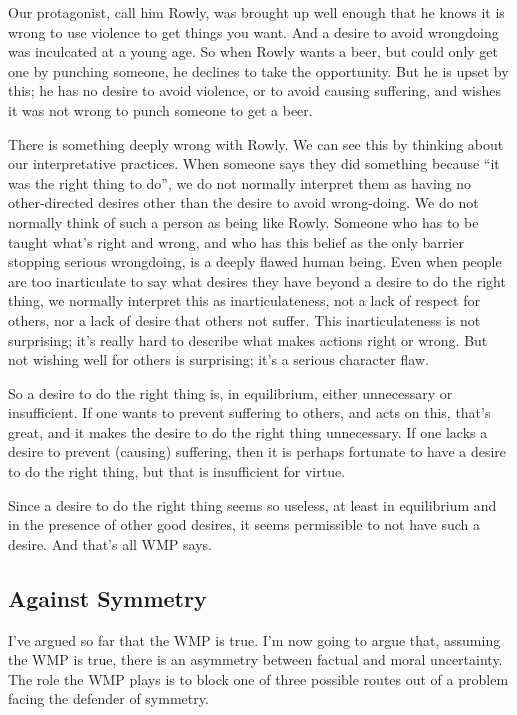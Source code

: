 Our protagonist, call him \gls{Rowly}, was brought up well enough that he knows it is wrong to use violence to get things you want. And a desire to avoid wrongdoing was inculcated at a young age. So when \gls{Rowly} wants a beer, but could only get one by punching someone, he declines to take the opportunity. But he is upset by this; he has no desire to avoid violence, or to avoid causing suffering, and wishes it was not wrong to punch someone to get a beer.

There is something deeply wrong with \gls{Rowly}. We can see this by thinking about our interpretative practices. When someone says they did something because ``it was the right thing to do'', we do not normally interpret them as having no other-directed desires other than the desire to avoid wrong-doing. We do not normally think of such a person as being like \gls{Rowly}. Someone who has to be taught what's right and wrong, and who has this belief as the only barrier stopping serious wrongdoing, is a deeply flawed human being. Even when people are too inarticulate to say what desires they have beyond a desire to do the right thing, we normally interpret this as inarticulateness, not a lack of respect for others, nor a lack of desire that others not suffer. This inarticulateness is not surprising; it's really hard to describe what makes actions right or wrong. But not wishing well for others is surprising; it's a serious character flaw.

So a desire to do the right thing is, in equilibrium, either unnecessary or insufficient. If one wants to prevent suffering to others, and acts on this, that's great, and it makes the desire to do the right thing unnecessary. If one lacks a desire to prevent (causing) suffering, then it is perhaps fortunate to have a desire to do the right thing, but that is insufficient for virtue.

Since a desire to do the right thing seems so useless, at least in equilibrium and in the presence of other good desires, it seems permissible to not have such a desire. And that's all WMP says.

\subsection{Against Symmetry}
\label{againstsymmetry}

I've argued so far that the WMP is true. I'm now going to argue that, assuming the WMP is true, there is an asymmetry between factual and moral uncertainty. The role the WMP plays is to block one of three possible routes out of a problem facing the defender of symmetry.

